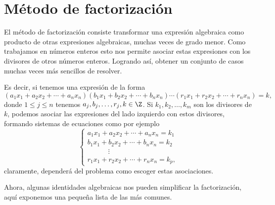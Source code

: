 
\section{Método de factorización}

El método de factorización consiste transformar una expresión algebraica como producto de otras expresiones algebraicas, muchas veces de grado menor.
Como trabajamos en números enteros esto nos permite asociar estas expresiones con los divisores de otros números enteros.
Logrando así, obtener un conjunto de casos muchas veces más sencillos de resolver.

Es decir, si tenemos una expresión de la forma
\[
    (a_1 x_1 + a_2 x_2 + \cdots + a_n x_n)(b_1 x_1 + b_2 x_2 + \cdots + b_n x_n) \cdots (r_1 x_1 + r_2 x_2 + \cdots + r_n x_n) = k,
\]
donde $1 \leq j \leq n$ tenemos $a_j, b_j, \ldots, r_j, k \in \Z$.
Si $k_1, k_2, \ldots, k_m$ son los divisores de $k$, podemos asociar las expresiones del lado izquierdo con estos divisores, formando sistemas de ecuaciones como por ejemplo
\[
    \begin{cases}
        a_1 x_1 + a_2 x_2 + \cdots + a_n x_n = k_1\\
        b_1 x_1 + b_2 x_2 + \cdots + b_n x_n = k_2\\
        \quad \qquad \vdots\\
        r_1 x_1 + r_2 x_2 + \cdots + r_n x_n = k_p,
    \end{cases}
\]
claramente, dependerá del problema como escoger estas asociaciones.

Ahora, algunas identidades algebraicas nos pueden simplificar la factorización, aquí exponemos una pequeña lista de las más comunes.
\vspace{2mm}

